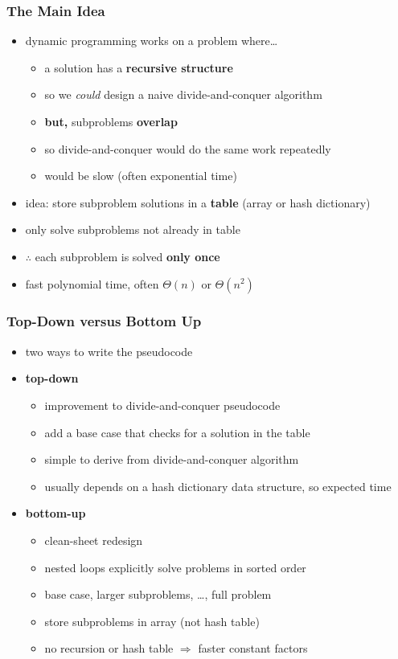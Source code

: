 \documentclass{beamer}
\begin{document}
\begin{frame} \frametitle{The Main Idea}
  \begin{itemize}
    \item dynamic programming works on a problem where\dots
    \begin{itemize}
      \item a solution has a \textbf{recursive structure}
      \item so we \emph{could} design a naive divide-and-conquer algorithm
      \item \textbf{but,} subproblems \textbf{overlap}
      \item so divide-and-conquer would do the same work repeatedly
      \item would be slow (often exponential time)
    \end{itemize}
    \item idea: store subproblem solutions in a \textbf{table} (array or hash dictionary)
    \item only solve subproblems not already in table
    \item $\therefore$ each subproblem is solved \textbf{only once}
    \item fast polynomial time, often $\Theta(n)$ or $\Theta(n^2)$
  \end{itemize}
\end{frame}

\begin{frame} \frametitle{Top-Down versus Bottom Up}
  \begin{itemize}
    \item two ways to write the pseudocode
    \item \textbf{top-down}
    \begin{itemize}
      \item improvement to divide-and-conquer pseudocode
      \item add a base case that checks for a solution in the table
      \item simple to derive from divide-and-conquer algorithm
      \item usually depends on a hash dictionary data structure, so expected time
    \end{itemize}
    \item \textbf{bottom-up}
    \begin{itemize}
      \item clean-sheet redesign
      \item nested loops explicitly solve problems in sorted order
      \item base case, larger subproblems, \dots, full problem
      \item store subproblems in array (not hash table)
      \item no recursion or hash table $\Rightarrow$ faster constant factors
    \end{itemize}
  \end{itemize}
\end{frame}
\end{document}
